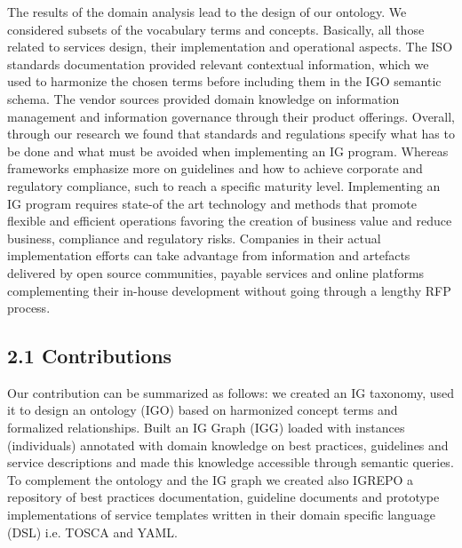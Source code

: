 \documentclass[a4paper,twoside]{article}
\begin{document}
The results of the domain analysis lead to the design of our ontology. We considered subsets of the vocabulary terms and concepts. Basically, all those related to services design, their implementation and operational aspects. The ISO standards documentation provided relevant contextual information, which we used to harmonize the chosen terms before including them in the IGO semantic schema. The vendor sources provided domain knowledge on information management and information governance through their product offerings. Overall, through our research we found that standards and regulations specify what has to be done and what must be avoided when implementing an IG program. Whereas frameworks emphasize more on guidelines and how to achieve corporate and regulatory compliance, such to reach a specific maturity level. Implementing an IG program requires state-of the art technology and methods that promote flexible and efficient operations favoring the creation of business value and reduce business, compliance and regulatory risks. Companies in their actual implementation efforts can take advantage from information and artefacts delivered by open source communities, payable services and online platforms complementing their in-house development without going through a lengthy RFP process. 
\subsection {2.1 Contributions}
Our contribution can be summarized as follows: we created an IG taxonomy, used it to design an ontology (IGO) based on harmonized concept terms and formalized relationships. Built an IG Graph (IGG) loaded with instances (individuals) annotated with domain knowledge on best practices, guidelines and service descriptions and made this knowledge accessible through semantic queries. To complement the ontology and the IG graph we created also   IGREPO a repository of best practices documentation, guideline documents and prototype implementations of service templates written in their domain specific language (DSL) i.e. TOSCA and YAML.
% 
%
\end{document}
